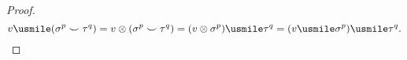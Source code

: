 \begin{proof}
  \begin{equation}
    v \usmile (\sigma^p \smile \tau^q)
    = v \otimes (\sigma^p \smile \tau^q)
    = (v \otimes \sigma^p) \usmile \tau^q
    = (v \usmile \sigma^p) \usmile \tau^q.
  \end{equation}
\end{proof}
